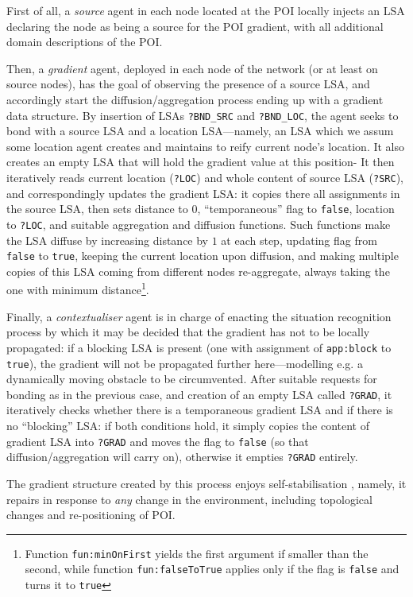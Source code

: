 \documentclass[12pt,a4paper,twoside,openright]{book}
\begin{document}
First of all, a \emph{source} agent in each node located at the POI locally injects an LSA declaring the node as being a source for the POI gradient, with all additional domain descriptions of the POI.

Then, a \emph{gradient} agent, deployed in each node of the network (or at least on source nodes), has the goal of observing the presence of a source LSA, and accordingly start the diffusion/aggregation process ending up with a gradient data structure. 
%
By insertion of LSAs \texttt{?BND\_SRC} and \texttt{?BND\_LOC}, the agent seeks to bond with a source LSA and a location LSA---namely, an LSA which we assum some location agent creates and maintains to reify current node's location.
%
It also creates an empty LSA that will hold the gradient value at this position-
%
It then iteratively reads current location (\texttt{?LOC}) and whole content of source LSA (\texttt{?SRC}), and correspondingly updates the gradient LSA: it copies there all assignments in the source LSA, then sets distance to $0$, ``temporaneous'' flag to \texttt{false}, location to \texttt{?LOC}, and suitable aggregation and diffusion functions.
%
Such functions make the LSA diffuse by increasing distance by $1$ at each step, updating flag from \texttt{false} to \texttt{true}, keeping the current location upon diffusion, and making multiple copies of this LSA coming from different nodes re-aggregate, always taking the one with minimum distance\footnote{Function \texttt{fun:minOnFirst} yields the first argument if smaller than the second, while function \texttt{fun:falseToTrue} applies only if the flag is \texttt{false} and turns it to \texttt{true}}.

Finally, a \emph{contextualiser} agent is in charge of enacting the situation recognition process by which it may be decided that the gradient has not to be locally propagated: if a blocking LSA is present (one with assignment of \texttt{app:block} to \texttt{true}), the gradient will not be propagated further here---modelling e.g. a dynamically moving obstacle to be circumvented.
%
After suitable requests for bonding as in the previous case, and creation of an empty LSA called \texttt{?GRAD}, it iteratively checks whether there is a temporaneous gradient LSA and if there is no ``blocking'' LSA: if both conditions hold, it simply copies the content of gradient LSA into \texttt{?GRAD} and moves the flag to \texttt{false} (so that diffusion/aggregation will carry on), otherwise it empties \texttt{?GRAD} entirely.

The gradient structure created by this process enjoys self-stabilisation \cite{VD-COORD2014-LNCS2014}, namely, it repairs in response to \emph{any} change in the environment, including topological changes and re-positioning of POI.
\end{document}

